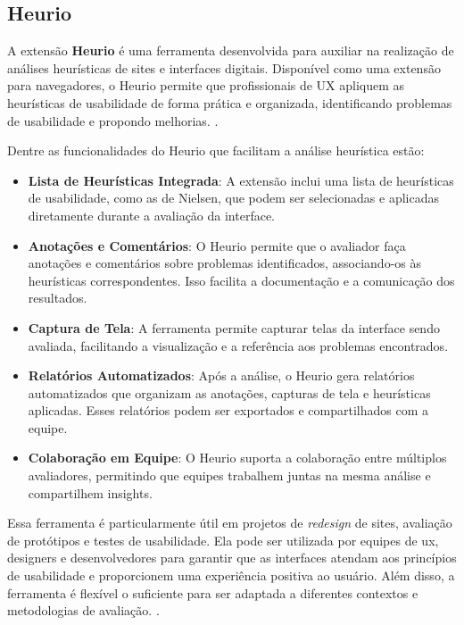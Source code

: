\subsection{Heurio}
A extensão \textbf{Heurio} é uma ferramenta desenvolvida para auxiliar na realização de análises heurísticas de sites e interfaces digitais. Disponível como uma extensão para navegadores, o Heurio permite que profissionais de UX apliquem as heurísticas de usabilidade de forma prática e organizada, identificando problemas de usabilidade e propondo melhorias. \citep{Heurio}.

Dentre as funcionalidades do Heurio que facilitam a análise heurística estão:

\begin{itemize}
    \item \textbf{Lista de Heurísticas Integrada}: A extensão inclui uma lista de heurísticas de usabilidade, como as de Nielsen, que podem ser selecionadas e aplicadas diretamente durante a avaliação da interface.
    
    \item \textbf{Anotações e Comentários}: O Heurio permite que o avaliador faça anotações e comentários sobre problemas identificados, associando-os às heurísticas correspondentes. Isso facilita a documentação e a comunicação dos resultados.
    
    \item \textbf{Captura de Tela}: A ferramenta permite capturar telas da interface sendo avaliada, facilitando a visualização e a referência aos problemas encontrados.
    
    \item \textbf{Relatórios Automatizados}: Após a análise, o Heurio gera relatórios automatizados que organizam as anotações, capturas de tela e heurísticas aplicadas. Esses relatórios podem ser exportados e compartilhados com a equipe.
    
    \item \textbf{Colaboração em Equipe}: O Heurio suporta a colaboração entre múltiplos avaliadores, permitindo que equipes trabalhem juntas na mesma análise e compartilhem insights.
\end{itemize}

Essa ferramenta é particularmente útil em projetos de \textit{redesign} de sites, avaliação de protótipos e testes de usabilidade. Ela pode ser utilizada por equipes de \gls{ux}, designers e desenvolvedores para garantir que as interfaces atendam aos princípios de usabilidade e proporcionem uma experiência positiva ao usuário. Além disso, a ferramenta é flexível o suficiente para ser adaptada a diferentes contextos e metodologias de avaliação. \citep{Heurio}.

